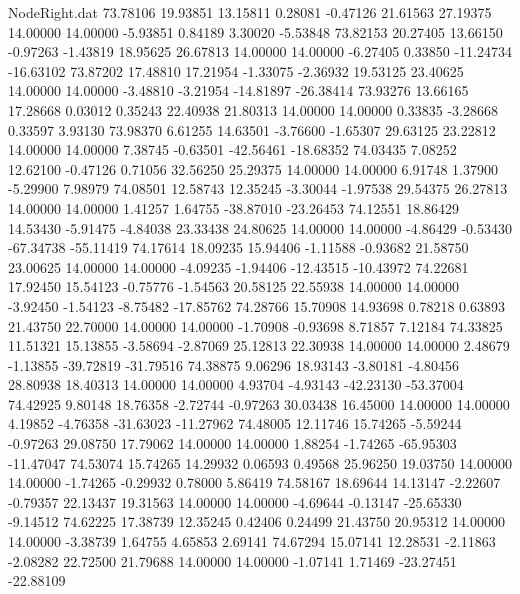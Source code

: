 \begin{filecontents}{NodeRight.dat}
  73.78106   19.93851   13.15811     0.28081   -0.47126   21.61563   27.19375   14.00000   14.00000   -5.93851    0.84189    3.30020   -5.53848
  73.82153   20.27405   13.66150    -0.97263   -1.43819   18.95625   26.67813   14.00000   14.00000   -6.27405    0.33850  -11.24734  -16.63102
  73.87202   17.48810   17.21954    -1.33075   -2.36932   19.53125   23.40625   14.00000   14.00000   -3.48810   -3.21954  -14.81897  -26.38414
  73.93276   13.66165   17.28668     0.03012    0.35243   22.40938   21.80313   14.00000   14.00000    0.33835   -3.28668    0.33597    3.93130
  73.98370    6.61255   14.63501    -3.76600   -1.65307   29.63125   23.22812   14.00000   14.00000    7.38745   -0.63501  -42.56461  -18.68352
  74.03435    7.08252   12.62100    -0.47126    0.71056   32.56250   25.29375   14.00000   14.00000    6.91748    1.37900   -5.29900    7.98979
  74.08501   12.58743   12.35245    -3.30044   -1.97538   29.54375   26.27813   14.00000   14.00000    1.41257    1.64755  -38.87010  -23.26453
  74.12551   18.86429   14.53430    -5.91475   -4.84038   23.33438   24.80625   14.00000   14.00000   -4.86429   -0.53430  -67.34738  -55.11419
  74.17614   18.09235   15.94406    -1.11588   -0.93682   21.58750   23.00625   14.00000   14.00000   -4.09235   -1.94406  -12.43515  -10.43972
  74.22681   17.92450   15.54123    -0.75776   -1.54563   20.58125   22.55938   14.00000   14.00000   -3.92450   -1.54123   -8.75482  -17.85762
  74.28766   15.70908   14.93698     0.78218    0.63893   21.43750   22.70000   14.00000   14.00000   -1.70908   -0.93698    8.71857    7.12184
  74.33825   11.51321   15.13855    -3.58694   -2.87069   25.12813   22.30938   14.00000   14.00000    2.48679   -1.13855  -39.72819  -31.79516
  74.38875    9.06296   18.93143    -3.80181   -4.80456   28.80938   18.40313   14.00000   14.00000    4.93704   -4.93143  -42.23130  -53.37004
  74.42925    9.80148   18.76358    -2.72744   -0.97263   30.03438   16.45000   14.00000   14.00000    4.19852   -4.76358  -31.63023  -11.27962
  74.48005   12.11746   15.74265    -5.59244   -0.97263   29.08750   17.79062   14.00000   14.00000    1.88254   -1.74265  -65.95303  -11.47047
  74.53074   15.74265   14.29932     0.06593    0.49568   25.96250   19.03750   14.00000   14.00000   -1.74265   -0.29932    0.78000    5.86419
  74.58167   18.69644   14.13147    -2.22607   -0.79357   22.13437   19.31563   14.00000   14.00000   -4.69644   -0.13147  -25.65330   -9.14512
  74.62225   17.38739   12.35245     0.42406    0.24499   21.43750   20.95312   14.00000   14.00000   -3.38739    1.64755    4.65853    2.69141
  74.67294   15.07141   12.28531    -2.11863   -2.08282   22.72500   21.79688   14.00000   14.00000   -1.07141    1.71469  -23.27451  -22.88109

\end{filecontents}
